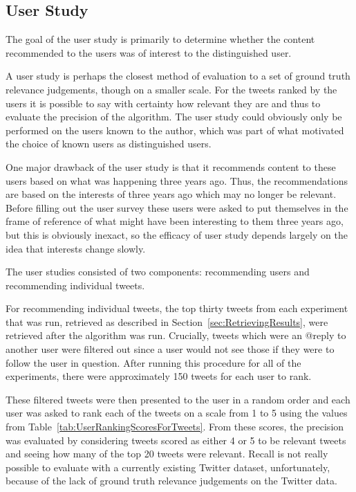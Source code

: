\subsection{User Study}
\label{sec:UserStudy}

The goal of the user study is primarily to determine whether the content recommended to the users was of interest to the distinguished user.

A user study is perhaps the closest method of evaluation to a set of ground truth relevance judgements, though on a smaller scale. For the tweets ranked by the users it is possible to say with certainty how relevant they are and thus to evaluate the precision of the algorithm. The user study could obviously only be performed on the users known to the author, which was part of what motivated the choice of known users as distinguished users.

One major drawback of the user study is that it recommends content to these users based on what was happening three years ago. Thus, the recommendations are based on the interests of three years ago which may no longer be relevant. Before filling out the user survey these users were asked to put themselves in the frame of reference of what might have been interesting to them three years ago, but this is obviously inexact, so the efficacy of user study depends largely on the idea that interests change slowly.

The user studies consisted of two components: recommending users and recommending individual tweets. 

For recommending individual tweets, the top thirty tweets from each experiment that was run, retrieved as described in Section~\ref{sec:RetrievingResults}, were retrieved after the algorithm was run. Crucially, tweets which were an @reply to another user were filtered out since a user would not see those if they were to follow the user in question. After running this procedure for all of the experiments, there were approximately 150 tweets for each user to rank.

These filtered tweets were then presented to the user in a random order and each user was asked to rank each of the tweets on a scale from 1 to 5 using the values from Table~\ref{tab:UserRankingScoresForTweets}. From these scores, the precision was evaluated by considering tweets scored as either 4 or 5 to be relevant tweets and seeing how many of the top 20 tweets were relevant. Recall is not really possible to evaluate with a currently existing Twitter dataset, unfortunately, because of the lack of ground truth relevance judgements on the Twitter data.



